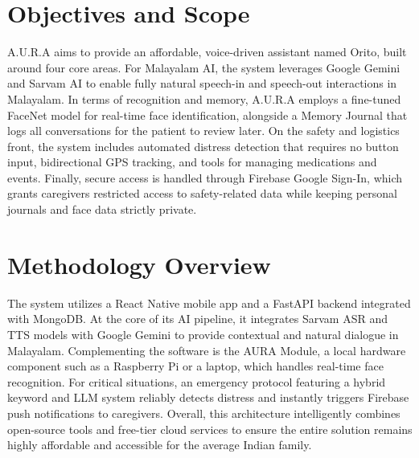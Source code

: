   \section{Objectives and Scope}
  A.U.R.A aims to provide an affordable, voice-driven assistant named Orito, built around four core areas. For Malayalam AI, the system leverages Google Gemini and Sarvam AI to enable fully natural speech-in and speech-out interactions in Malayalam. In terms of recognition and memory, A.U.R.A employs a fine-tuned FaceNet model for real-time face identification, alongside a Memory Journal that logs all conversations for the patient to review later. On the safety and logistics front, the system includes automated distress detection that requires no button input, bidirectional GPS tracking, and tools for managing medications and events. Finally, secure access is handled through Firebase Google Sign-In, which grants caregivers restricted access to safety-related data while keeping personal journals and face data strictly private.
 
 
\section{Methodology Overview}
The system utilizes a React Native mobile app and a FastAPI backend integrated with MongoDB. At the core of its AI pipeline, it integrates Sarvam ASR and TTS models with Google Gemini to provide contextual and natural dialogue in Malayalam. Complementing the software is the AURA Module, a local hardware component such as a Raspberry Pi or a laptop, which handles real-time face recognition. For critical situations, an emergency protocol featuring a hybrid keyword and LLM system reliably detects distress and instantly triggers Firebase push notifications to caregivers. Overall, this architecture intelligently combines open-source tools and free-tier cloud services to ensure the entire solution remains highly affordable and accessible for the average Indian family.
  